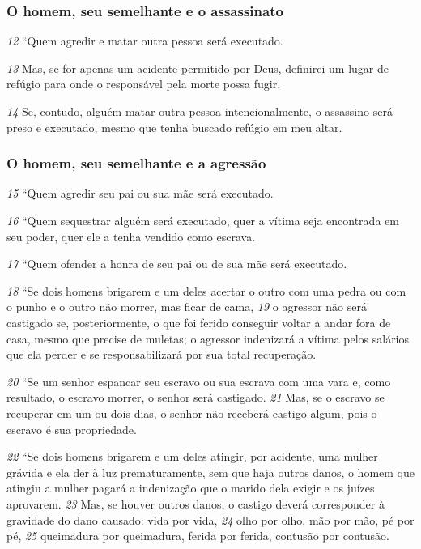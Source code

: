 \bigskip
\subsubsection*{O homem, seu semelhante e o assassinato}
\textit{\tiny 12}
“Quem agredir e matar outra pessoa será executado.

\smallskip
\textit{\tiny 13}
Mas, se for apenas um
acidente permitido por Deus, definirei um lugar de refúgio para onde o
responsável pela morte possa fugir. 

\smallskip
\textit{\tiny 14}
Se, contudo, alguém matar outra pessoa
intencionalmente, o assassino será preso e executado, mesmo que tenha buscado
refúgio em meu altar.
   
\bigskip
\subsubsection*{O homem, seu semelhante e a agressão}
\textit{\tiny 15}
“Quem agredir seu pai ou sua mãe será executado.
   
\smallskip
\textit{\tiny 16}
“Quem sequestrar alguém será executado, quer a vítima seja encontrada em
seu poder, quer ele a tenha vendido como escrava.

\smallskip
\textit{\tiny 17}
“Quem ofender a honra de seu pai ou de sua mãe será executado.
  
\smallskip
\textit{\tiny 18}
“Se dois homens brigarem e um deles acertar o outro com uma pedra ou com
o punho e o outro não morrer, mas ficar de cama, 
\textit{\tiny 19}
o agressor não será castigado
se, posteriormente, o que foi ferido conseguir voltar a andar fora de casa, mesmo
que precise de muletas; o agressor indenizará a vítima pelos salários que ela
perder e se responsabilizará por sua total recuperação.
   
\smallskip
\textit{\tiny 20}
“Se um senhor espancar seu escravo ou sua escrava com uma vara e, como
resultado, o escravo morrer, o senhor será castigado. 
\textit{\tiny 21}
Mas, se o escravo se
recuperar em um ou dois dias, o senhor não receberá castigo algum, pois o
escravo é sua propriedade.
   
\smallskip
\textit{\tiny 22}
“Se dois homens brigarem e um deles atingir, por acidente, uma mulher
grávida e ela der à luz prematuramente, sem que haja outros danos, o homem
que atingiu a mulher pagará a indenização que o marido dela exigir e os juízes
aprovarem. 
\textit{\tiny 23}
Mas, se houver outros danos, o castigo deverá corresponder à
gravidade do dano causado: vida por vida, 
\textit{\tiny 24}
olho por olho, mão por mão, pé por
pé, 
\textit{\tiny 25}
queimadura por queimadura, ferida por ferida, contusão por contusão.
   
